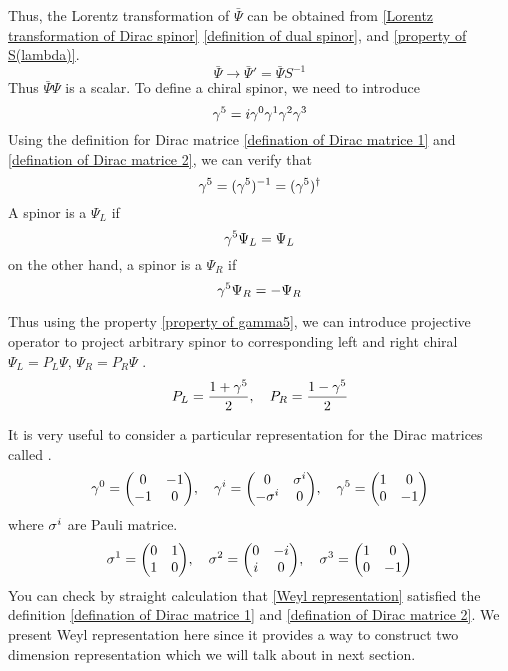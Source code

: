 Thus, the Lorentz transformation of $\bar{\Psi}$ can be obtained from \eqref{Lorentz transformation of Dirac spinor}  \eqref{definition of dual spinor}, and \eqref{property of S(lambda)}.
\begin{equation} \label{Lorentz transformation of barPsi}
\bar\Psi \rightarrow \bar{\Psi}' = \bar{\Psi}S^{-1}
\end{equation}
Thus $\bar{\Psi}\Psi$ is a scalar.
To define a chiral spinor, we need to introduce
\begin{equation}
  \gamma^5 = i\gamma^0\gamma^1\gamma^2\gamma^3
\end{equation}
Using the definition for Dirac matrice \eqref{defination of Dirac matrice 1} and \eqref{defination of Dirac matrice 2}, we can verify that
\begin{equation} \label{property of gamma5}
\gamma^5 =(\gamma^5)^{-1} = (\gamma^5)^{\dagger}
\end{equation}
A spinor is a  $\Psi_L$ if
\begin{equation} \label{definition of left chiral spinor}
\gamma^5\Psi_L = \Psi_L
\end{equation}
on the other hand, a spinor is a  $\Psi_R$ if
\begin{equation} \label{definition of right chiral spinor}
\gamma^5 \Psi_R = -\Psi_R
\end{equation}


Thus using the property \eqref{property of gamma5}, we can introduce projective operator to project arbitrary spinor to corresponding left and right chiral $\Psi_L = P_L\Psi$, $\Psi_R = P_R\Psi$ .
\begin{equation}
  P_L = \frac{1+\gamma^5}{2} ,\quad P_R = \frac{1-\gamma^5}{2}
\end{equation}

It is very useful to consider a particular representation for the Dirac matrices called .
\begin{equation} \label{Weyl representation}
\g^0 = \mqty(  0 & -1\\
-1 &  0),\quad
\g^i = \mqty(  0 &  \s^{i}\\
-\s^{i}&   0   ),\quad
\g^5 = \mqty(  1 &  0\\
0 & -1)
\end{equation}
where $\sigma^i$ are Pauli matrice.
\begin{equation} \label{Pauli matrice}
\s^1 = \mqty( 0 & 1 \\
1 & 0),\quad
\s^2 = \mqty( 0 & -i \\
i & 0),\quad
\s^3 = \mqty( 1 & 0 \\
0 & -1)
\end{equation}
You can check by straight calculation that \eqref{Weyl representation} satisfied the definition \eqref{defination of Dirac matrice 1} and \eqref{defination of Dirac matrice 2}. We present Weyl representation here since it provides a way to construct two dimension representation which we will talk about in next section.

